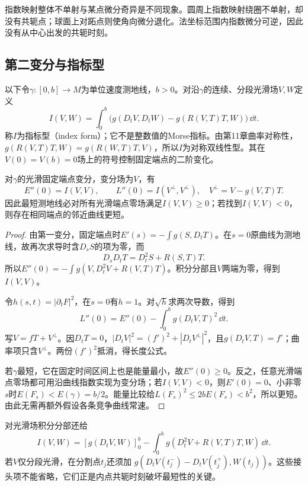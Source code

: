 指数映射整体不单射与某点微分奇异是不同现象。圆周上指数映射绕圈不单射，却没有共轭点；球面上对跖点则使角向微分退化。法坐标范围内指数微分可逆，因此没有从中心出发的共轭时刻。

\subsection*{第二变分与指标型}
以下令$\gamma:[0,b]\to M$为单位速度测地线，$b>0$。对沿$\gamma$的连续、分段光滑场$V,W$定义
\[
 I(V,W)=\int_0^b\bigl(g(D_tV,D_tW)-g(R(V,T)T,W)\bigr)\,\dd t.
\]
称$I$为指标型（index form）；它不是整数值的Morse指标。由第11章曲率对称性，$g(R(V,T)T,W)=g(R(W,T)T,V)$，所以$I$为对称双线性型。其在$V(0)=V(b)=0$场上的符号控制固定端点的二阶变化。

\begin{theorem}[固定端点的第二变分]\label{thm:second-variation}
对$\gamma$的光滑固定端点变分，变分场为$V$，有
\[
 E''(0)=I(V,V),\qquad L''(0)=I(V^\perp,V^\perp),
 \quad V^\perp=V-g(V,T)T.
\]
因此最短测地线必对所有光滑端点零场满足$I(V,V)\geq0$；若找到$I(V,V)<0$，则存在相同端点的邻近曲线更短。
\end{theorem}
\begin{proof}
由第一变分，固定端点时$E'(s)=-\int g(S,D_tT)$。在$s=0$原曲线为测地线，故再次求导时含$D_sS$的项为零，而
\[
 D_sD_tT=D_t^2S+R(S,T)T.
\]
所以$E''(0)=-\int g(V,D_t^2V+R(V,T)T)$。积分分部且$V$两端为零，得到$I(V,V)$。

令$h(s,t)=|\partial_tF|^2$，在$s=0$有$h=1$。对$\sqrt h$求两次导数，得到
\[
 L''(0)=E''(0)-\int_0^b g(D_tV,T)^2\,\dd t.
\]
写$V=fT+V^\perp$。因$D_tT=0$，$|D_tV|^2=(f')^2+|D_tV^\perp|^2$，且$g(D_tV,T)=f'$；曲率项只含$V^\perp$。两份$(f')^2$抵消，得长度公式。

若$\gamma$最短，它在固定时间区间上也是能量最小，故$E''(0)\geq0$。反之，任意光滑端点零场都可用沿曲线指数实现为变分场；若$I(V,V)<0$，则$E'(0)=0$、小非零$s$时$E(F_s)<E(\gamma)=b/2$。能量比较给$L(F_s)^2\leq2bE(F_s)<b^2$，所以更短。由此无需再额外假设各条竞争曲线常速。
\end{proof}

对光滑场积分分部还给
\[
 I(V,W)=[g(D_tV,W)]_0^b
 -\int_0^b g(D_t^2V+R(V,T)T,W)\,\dd t.
\]
若$V$仅分段光滑，在分割点$t_j$还须加
$g(D_tV(t_j^-)-D_tV(t_j^+),W(t_j))$。这些接头项不能省略，它们正是内点共轭时刻破坏最短性的关键。

